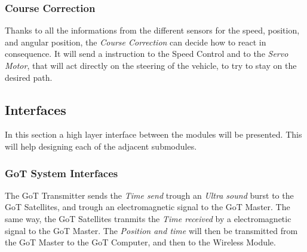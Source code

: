 \subsubsection{Course Correction}
Thanks to all the informations from the different sensors for the speed, position, and angular position, the \textit{Course Correction} can decide how to react in consequence. It will send a instruction to the Speed Control and to the \textit{Servo Motor}, that will act directly on the steering of the vehicle, to try to stay on the desired path.



\subsection{Interfaces}
In this section a high layer interface between the modules will be presented. This will help designing each of the adjacent submodules.

\subsubsection{GoT System Interfaces}
The GoT Transmitter sends the \textit{Time send} trough an \textit{Ultra sound} burst to the GoT Satellites, and trough an electromagnetic signal to the GoT Master. The same way, the GoT Satellites tranmits the \textit{Time received} by a electromagnetic signal to the GoT Master. The \textit{Position and time} will then be transmitted from the GoT Master to the GoT Computer, and then to the Wireless Module.


